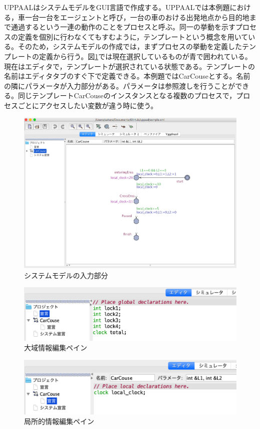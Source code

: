 \documentclass{tpu-sotu}
\begin{document}
	UPPAALはシステムモデルをGUI言語で作成する。UPPAALでは本例題における，車一台一台をエージェントと呼び，一台の車のおける出発地点から目的地まで通過するという一連の動作のことをプロセスと呼ぶ。同一の挙動を示すプロセスの定義を個別に行わなくてもすむように，テンプレートという概念を用いている。そのため，システムモデルの作成では，まずプロセスの挙動を定義したテンプレートの定義から行う。図\ref{CC}では現在選択しているものが青で囲われている。現在はエディタで，テンプレートが選択されている状態である。テンプレートの名前はエディタタブのすぐ下で定義できる。本例題ではCarCouseとする。名前の隣にパラメータが入力部分がある。パラメータは参照渡しを行うことができる。同じテンプレートCarCouseのインスタンスとなる複数のプロセスで，プロセスごとにアクセスしたい変数が違う時に使う。
	\begin{figure}[htbp]
	\centering
	\includegraphics[width=160mm]{CarCouse.png}
	\caption{システムモデルの入力部分}
	\label{CC}
	\end{figure}
	\begin{figure}[htbp]
	\centering
	\includegraphics[width=140mm]{GlobalDec.png}
	\caption{大域情報編集ペイン}
	\label{GD}
	\end{figure}
	\begin{figure}[htbp]
	\centering
	\includegraphics[width=140mm]{LocalDec.png}
	\caption{局所的情報編集ペイン}
	\label{LD}
	\end{figure}
\end{document}
